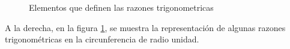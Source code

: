 \begin{itemize}
\begin{figure}[htbp]
\begin{center}
\end{center}
\caption{Elementos que definen las razones trigonometricas}
\label{ElementosRazonesTrigonometricas}
\end{figure}

A la derecha, en la figura \ref{ElementosRazonesTrigonometricas}, se muestra la representaci\'on de algunas razones trigonom\'etricas en la circunferencia de radio unidad.


\end{itemize}
